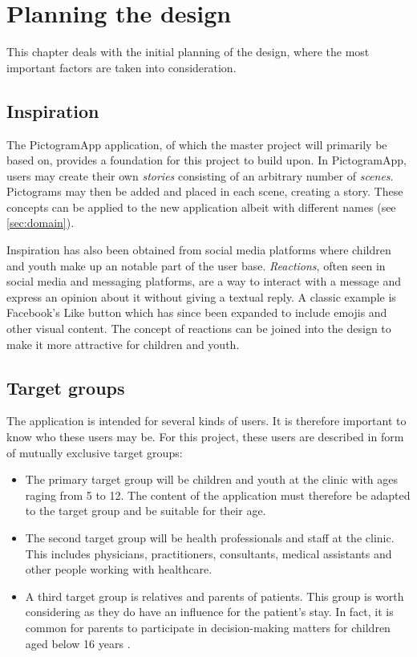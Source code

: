 \chapter{Planning the design}
\label{ch:planning}

This chapter deals with the initial planning of the design, where the most important factors are taken into consideration.

\section{Inspiration}
\label{sec:inspiration}

The PictogramApp application, of which the master project will primarily be based on, provides a foundation for this project to build upon. In PictogramApp, users may create their own \emph{stories} consisting of an arbitrary number of \emph{scenes}. Pictograms may then be added and placed in each scene, creating a story. These concepts can be applied to the new application albeit with different names (see \autoref{sec:domain}).

Inspiration has also been obtained from social media platforms where children and youth make up an notable part of the user base. \emph{Reactions}, often seen in social media and messaging platforms, are a way to interact with a message and express an opinion about it without giving a textual reply. A classic example is Facebook's Like button which has since been expanded to include emojis and other visual content. The concept of reactions can be joined into the design to make it more attractive for children and youth.

\section{Target groups}
\label{sec:targetgroups}

The application is intended for several kinds of users. It is therefore important to know who these users may be. For this project, these users are described in form of mutually exclusive target groups:

\begin{itemize}
    \item The primary target group will be children and youth at the clinic with ages raging from 5 to 12. The content of the application must therefore be adapted to the target group and be suitable for their age.
    \item The second target group will be health professionals and staff at the clinic. This includes physicians, practitioners, consultants, medical assistants and other people working with healthcare.
    \item A third target group is relatives and parents of patients. This group is worth considering as they do have an influence for the patient's stay. In fact, it is common for parents to participate in decision-making matters for children aged below 16 years \autocite{helsedirektoratet2018}.
\end{itemize}


